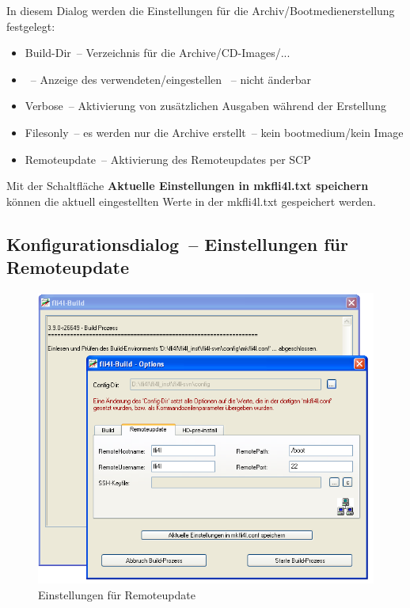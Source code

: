   In diesem Dialog werden die Einstellungen für die Archiv/Bootmedienerstellung
  festgelegt:
  \begin{itemize}
    \item Build-Dir~-- Verzeichnis für die Archive/CD-Images/...
    \item {}~-- Anzeige des verwendeten/eingestellen ~-- nicht änderbar
    \item Verbose~-- Aktivierung von zusätzlichen Ausgaben während der Erstellung
    \item Filesonly~-- es werden nur die Archive erstellt~-- kein bootmedium/kein Image
    \item Remoteupdate~-- Aktivierung des Remoteupdates per SCP
  \end{itemize}

  Mit der Schaltfläche \textbf{Aktuelle Einstellungen in mkfli4l.txt speichern}
  können die aktuell eingestellten Werte in der mkfli4l.txt gespeichert werden.

  \subsection{Konfigurationsdialog~-- Einstellungen für Remoteupdate}
  \begin{figure}[ht!]
  \centering
  \includegraphics[width=\columnwidth]{win_build_remoteupdate}
  \caption{Einstellungen für Remoteupdate}
  \label{fig:win_build_remoteupdate}
  \end{figure}

